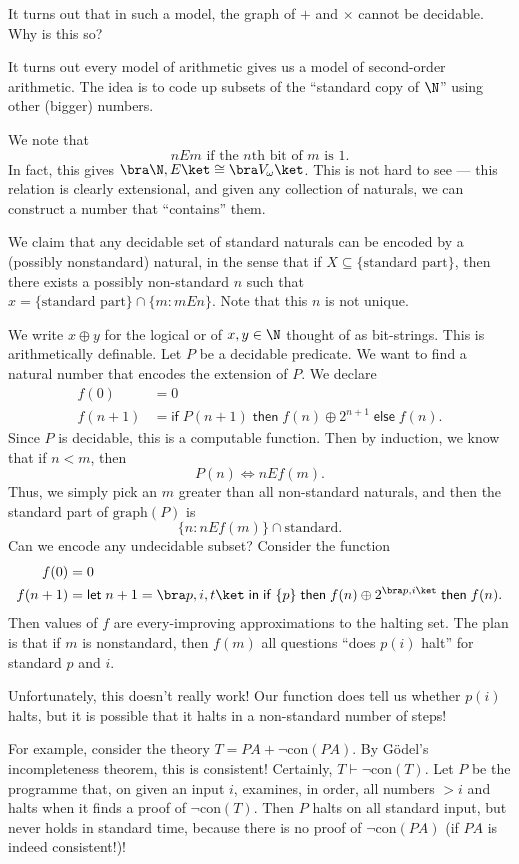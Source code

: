 \documentclass[a4paper]{article}
\newcommand\clet{\mathsf{let}\;}
\newcommand\cin{\;\mathsf{in}\;}
\newcommand\cif{\mathsf{if}\;}
\newcommand\cthen{\;\mathsf{then}\;}
\newcommand\celse{\;\mathsf{else}\;}
\newcommand\con{\mathrm{con}}
\begin{document}
It turns out that in such a model, the graph of $+$ and $\times$ cannot be decidable. Why is this so?

It turns out every model of arithmetic gives us a model of second-order arithmetic. The idea is to code up subsets of the ``standard copy of $\N$'' using other (bigger) numbers.

We note that
\[
  nEm\text{ if the $n$th bit of $m$ is $1$}.
\]
In fact, this gives $\bra \N, E\ket \cong \bra V_\omega\ket$. This is not hard to see --- this relation is clearly extensional, and given any collection of naturals, we can construct a number that ``contains'' them.

We claim that any decidable set of standard naturals can be encoded by a (possibly nonstandard) natural, in the sense that if $X \subseteq \{\text{standard part}\}$, then there exists a possibly non-standard $n$ such that $x = \{\text{standard part}\} \cap \{m: m E n\}$. Note that this $n$ is not unique.

We write $x \oplus y$ for the logical or of $x, y \in \N$ thought of as bit-strings. This is arithmetically definable. Let $P$ be a decidable predicate. We want to find a natural number that encodes the extension of $P$. We declare
\begin{align*}
  f(0) &= 0\\
  f(n + 1) &= \cif P(n + 1) \cthen f(n) \oplus 2^{n + 1} \celse f(n).
\end{align*}
Since $P$ is decidable, this is a computable function. Then by induction, we know that if $n < m$, then %
\[
  P(n) \Leftrightarrow n E f(m).
\]
Thus, we simply pick an $m$ greater than all non-standard naturals, and then the standard part of $\mathrm{graph}(P)$ is
\[
  \{n: n E f(m)\} \cap \text{standard}.
\]
Can we encode any undecidable subset? Consider the function
\begin{align*}
  f(0) &= 0\\
  f(n + 1) &= \clet n + 1 = \bra p, i, t\ket \cin \cif \{p\} \cthen f(n) \oplus 2^{\bra p, i \ket} \cthen f(n).
\end{align*}
Then values of $f$ are every-improving approximations to the halting set. The plan is that if $m$ is nonstandard, then $f(m)$ all questions ``does $p(i)$ halt'' for standard $p$ and $i$.

Unfortunately, this doesn't really work! Our function does tell us whether $p(i)$ halts, but it is possible that it halts in a non-standard number of steps!

For example, consider the theory $T = PA + \neg \con(PA)$. By G\"odel's incompleteness theorem, this is consistent! Certainly, $T \vdash \neg \con(T)$. Let $P$ be the programme that, on given an input $i$, examines, in order, all numbers $ > i$ and halts when it finds a proof of $\neg\con(T)$. Then $P$ halts on all standard input, but never holds in standard time, because there is no proof of $\neg \con (PA)$ (if $PA$ is indeed consistent!)!
\end{document}
